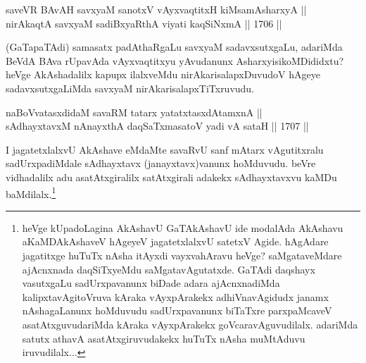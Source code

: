 \begin{shl}
saveVR BAvAH savxyaM sanotxV vAyxvaqtitxH kiMsamAsharxyA || \\
nirAkaqtA savxyaM sadiBxyaRthA viyati kaqSiNxmA \hfill || 1706 ||  
\end{shl}

\begin{artha}
(GaTapaTAdi) samasatx padAthaRgaLu savxyaM sadavxsutxgaLu, adariMda BeVdA BAva rUpavAda vAyxvaqtitxyu yAvudanunx AsharxyisikoMDididxtu? heVge AkAshadalilx kapupx ilalxveMdu nirAkarisalapxDuvudoV hAgeye sadavxsutxgaLiMda savxyaM nirAkarisalapxTiTxruvudu.
\end{artha}

\begin{shl}
naBoVvatasxdidaM savaRM tatarx yatatxtasxdAtamxnA || \\
sAdhayxtavxM nAnayxthA daqSaTxmasatoV yadi vA sataH \hfill || 1707 ||  
\end{shl}

\begin{artha}
I jagatetxlalxvU AkAshave eMdaMte savaRvU sanf mAtarx vAgutitxralu sadUrxpadiMdale sAdhayxtavx (janayxtavx)vanunx hoMduvudu. beVre vidhadalilx adu asatAtxgiralilx satAtxgirali adakekx sAdhayxtavxvu kaMDu baMdilalx.\footnote{heVge kUpadoLagina AkAshavU GaTAkAshavU ide modalAda AkAshavu aKaMDAkAshaveV hAgeyeV jagatetxlalxvU satetxV Agide. hAgAdare jagatitxge huTuTx nAsha itAyxdi vayxvahAravu heVge? saMgataveMdare ajAcnxnada daqSiTxyeMdu saMgatavAgutatxde. GaTAdi daqshayx vasutxgaLu sadUrxpavanunx biDade adara ajAcnxnadiMda kalipxtavAgitoVruva kAraka vAyxpArakekx adhiVnavAgidudx janamx nAshagaLanunx hoMduvudu sadUrxpavanunx biTaTxre parxpaMcaveV asatAtxguvudariMda kAraka vAyxpArakekx goVcaravAguvudilalx. adariMda satutx athavA asatAtxgiruvudakekx huTuTx nAsha muMtAduvu iruvudilalx...}
\end{artha}
